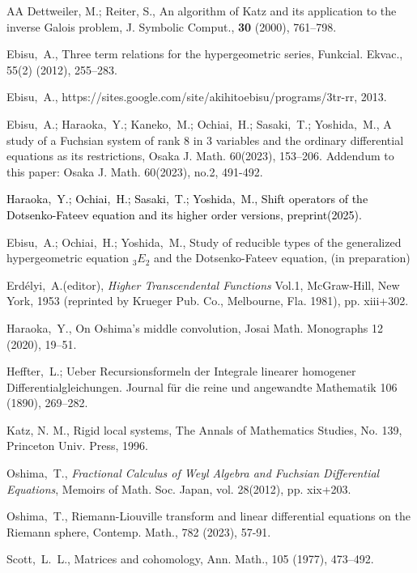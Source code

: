 \documentclass[a4paper,12pt]{article}
\theoremstyle{definition}
\theoremstyle{remark}
\numberwithin{equation}{section} %
\newcommand{\red}[1]{\textcolor{black}{#1}}
\begin{document}
\newpage
 
\begin{thebibliography}{AA}
Dettweiler, M.; Reiter, S.,  An algorithm of Katz and its application to the inverse Galois problem,  J. Symbolic Comput., {\bf 30} (2000), 761--798.

 Ebisu,~A., Three term relations for the   hypergeometric series, Funkcial. Ekvac., 55(2) (2012), 255--283.

 Ebisu,~A., {https://sites.google.com/site/akihitoebisu/programs/3tr-rr}, 2013.

 Ebisu,~A.; Haraoka,~Y.; Kaneko,~M.; Ochiai,~H.; Sasaki,~T.; Yoshida,~M., A study of a Fuchsian system of rank 8 in 3 variables and the ordinary differential equations as its restrictions, Osaka J. Math. 60(2023), 153--206.  Addendum to this paper: Osaka J. Math. 60(2023), no.2, 491-492.

   \red{Haraoka,~Y.; Ochiai,~H.; Sasaki,~T.; Yoshida,~M., Shift operators of the Dotsenko-Fateev equation and its higher order versions, preprint(2025).}

 Ebisu,~A.; Ochiai,~H.; Yoshida,~M., Study of reducible types of the generalized hypergeometric equation ${}_3E_2$ and the Dotsenko-Fateev equation, (in preparation)

 Erd\'elyi,~A.(editor), {\sl Higher Transcendental Functions}   Vol.1, McGraw-Hill, New York, 1953 (reprinted by Krueger Pub. Co.,   Melbourne, Fla. 1981), pp. xiii+302.
  
Haraoka,~Y., On Oshima's middle convolution,
  Josai Math. Monographs 12 (2020), 19--51.

 Heffter,~L.; Ueber Recursionsformeln der Integrale linearer homogener Differentialgleichungen. Journal f\"ur die reine und angewandte Mathematik 106 (1890), 269--282.

 Katz, N. M.,
 Rigid local systems, The Annals of Mathematics Studies, No. 139,
Princeton Univ. Press, 1996.

 Oshima,~T., {\sl Fractional Calculus of Weyl Algebra
  and Fuchsian Differential Equations}, Memoirs of Math. Soc. Japan,
  vol. 28(2012), pp. xix+203.

 Oshima,~T., 
 Riemann-Liouville transform and linear differential equations on the Riemann sphere,  Contemp. Math., 782 (2023), 57-91.

Scott,~L.~L., Matrices and cohomology, Ann. Math., 105 (1977), 473--492.


\end{thebibliography}
\end{document}
